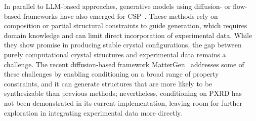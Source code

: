 In parallel to LLM-based approaches, generative models using diffusion- or flow-based frameworks have also emerged for CSP~\cite{jiao2023crystal, millerflowmm,zeni2025generative}. These methods rely on composition or partial structural constraints to guide generation, which requires domain knowledge and can limit direct incorporation of experimental data. While they show promise in producing stable crystal configurations, the gap between purely computational crystal structures and experimental data remains a challenge. The recent diffusion-based framework MatterGen~\cite{zeni2025generative} addresses some of these challenges by enabling conditioning on a broad range of property constraints, and it can generate structures that are more likely to be synthesizable than previous methods; nevertheless, conditioning on PXRD has not been demonstrated in its current implementation, leaving room for further exploration in integrating experimental data more directly.